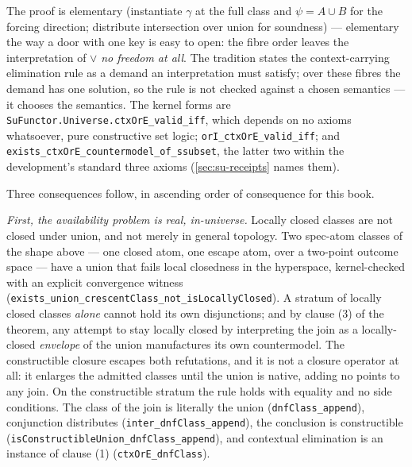 The proof is elementary (instantiate $\gamma$ at the full class and
$\psi = A \cup B$ for the forcing direction; distribute
intersection over union for soundness) --- elementary the way a
door with one key is easy to open: the fibre order leaves the
interpretation of $\vee$ \emph{no freedom at all}. The tradition
states the context-carrying elimination rule as a demand an
interpretation must satisfy; over these fibres the demand has one
solution, so the rule is not checked against a chosen semantics
--- it chooses the semantics. The kernel forms are
\texttt{SuFunctor.Universe.ctxOrE\_valid\_iff}, which depends on
no axioms whatsoever, pure constructive set logic;
\texttt{orI\_ctxOrE\_valid\_iff}; and
\texttt{exists\_ctxOrE\_countermodel\_of\_ssubset}, the latter two
within the development's standard three axioms
(\autoref{sec:su-receipts} names them).

Three consequences follow, in ascending order of consequence for
this book.

\emph{First, the availability problem is real, in-universe.}
Locally closed classes are not closed under union, and not merely
in general topology. Two spec-atom classes of the shape above ---
one closed atom, one escape atom, over a two-point outcome space
--- have a union that fails local closedness in the hyperspace,
kernel-checked with an explicit convergence witness
(\texttt{exists\_union\_crescentClass\_not\_isLocallyClosed}). A
stratum of locally closed classes \emph{alone} cannot hold its own
disjunctions; and by clause (3) of the theorem, any attempt to
stay locally closed by interpreting the join as a locally-closed
\emph{envelope} of the union manufactures its own countermodel.
The constructible closure escapes both refutations, and it is not
a closure operator at all: it enlarges the admitted classes until
the union is native, adding no points to any join. On the
constructible stratum the rule holds with equality and no side
conditions. The class of the join is literally the union
(\texttt{dnfClass\_append}), conjunction distributes
(\texttt{inter\_dnfClass\_append}), the conclusion is
constructible (\texttt{isConstructibleUnion\_dnfClass\_append}),
and contextual elimination is an instance of clause (1)
(\texttt{ctxOrE\_dnfClass}).

